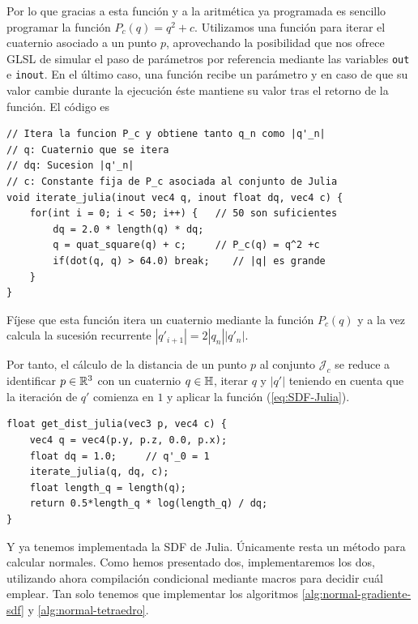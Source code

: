 Por lo que gracias a esta función y a la aritmética ya programada es sencillo programar la función $P_c(q)=q^2+c$. Utilizamos una función para iterar el cuaternio asociado a un punto $p$, aprovechando la posibilidad que nos ofrece GLSL de simular el paso de parámetros por referencia mediante las variables \verb|out| e \verb|inout|. En el último caso, una función recibe un parámetro y en caso de que su valor cambie durante la ejecución éste mantiene su valor tras el retorno de la función. El código es 
\begin{lstlisting}
// Itera la funcion P_c y obtiene tanto q_n como |q'_n|
// q: Cuaternio que se itera
// dq: Sucesion |q'_n|
// c: Constante fija de P_c asociada al conjunto de Julia
void iterate_julia(inout vec4 q, inout float dq, vec4 c) {
    for(int i = 0; i < 50; i++) {   // 50 son suficientes
        dq = 2.0 * length(q) * dq;
        q = quat_square(q) + c;     // P_c(q) = q^2 +c
        if(dot(q, q) > 64.0) break;    // |q| es grande
    }
}
\end{lstlisting}

Fíjese que esta función itera un cuaternio mediante la función $P_c(q)$ y a la vez calcula la sucesión recurrente $|q'_{i+1}|=2|q_n||q'_n|$. 

Por tanto, el cálculo de la distancia de un punto $p$ al conjunto $\mathcal{J}_c$ se reduce a identificar $p\in\mathbb{R}^3$ con un cuaternio $q\in\mathbb{H}$, iterar $q$ y $|q'|$ teniendo en cuenta que la iteración de $q'$ comienza en $1$ y aplicar la función (\ref{eq:SDF-Julia}).

\begin{lstlisting}
float get_dist_julia(vec3 p, vec4 c) { 
    vec4 q = vec4(p.y, p.z, 0.0, p.x);
    float dq = 1.0;     // q'_0 = 1
    iterate_julia(q, dq, c);
    float length_q = length(q);
    return 0.5*length_q * log(length_q) / dq;
}
\end{lstlisting}

Y ya tenemos implementada la SDF de Julia. Únicamente resta un método para calcular normales. Como hemos presentado dos, implementaremos los dos, utilizando ahora compilación condicional mediante macros para decidir cuál emplear. Tan solo tenemos que implementar los algoritmos \ref{alg:normal-gradiente-sdf} y \ref{alg:normal-tetraedro}. %

